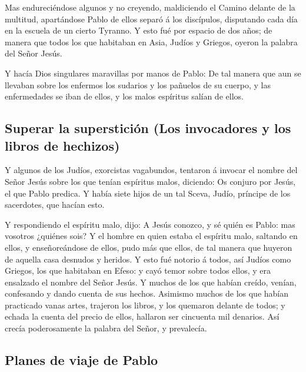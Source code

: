  Mas endureciéndose algunos y no creyendo, maldiciendo el
Camino delante de la multitud, apartándose Pablo de ellos separó á los
discípulos, disputando cada día en la escuela de un cierto Tyranno.
 Y esto fué por espacio de dos años; de manera que todos
los que habitaban en Asia, Judíos y Griegos, oyeron la palabra del Señor
Jesús.

 Y hacía Dios singulares maravillas por manos de Pablo:
 De tal manera que aun se llevaban sobre los enfermos los
sudarios y los pañuelos de su cuerpo, y las enfermedades se iban de
ellos, y los malos espíritus salían de ellos.

\hypertarget{superar-la-supersticiuxf3n-los-invocadores-y-los-libros-de-hechizos}{%
\subsection{Superar la superstición (Los invocadores y los libros de
hechizos)}\label{superar-la-supersticiuxf3n-los-invocadores-y-los-libros-de-hechizos}}

 Y algunos de los Judíos, exorcistas vagabundos, tentaron á
invocar el nombre del Señor Jesús sobre los que tenían espíritus malos,
diciendo: Os conjuro por Jesús, el que Pablo predica.  Y
había siete hijos de un tal Sceva, Judío, príncipe de los sacerdotes,
que hacían esto.

 Y respondiendo el espíritu malo, dijo: A Jesús conozco, y
sé quién es Pablo: mas vosotros ¿quiénes sois?  Y el hombre
en quien estaba el espíritu malo, saltando en ellos, y enseñoreándose de
ellos, pudo más que ellos, de tal manera que huyeron de aquella casa
desnudos y heridos.  Y esto fué notorio á todos, así Judíos
como Griegos, los que habitaban en Efeso: y cayó temor sobre todos
ellos, y era ensalzado el nombre del Señor Jesús.  Y muchos
de los que habían creído, venían, confesando y dando cuenta de sus
hechos.  Asimismo muchos de los que habían practicado vanas
artes, trajeron los libros, y los quemaron delante de todos; y echada la
cuenta del precio de ellos, hallaron ser cincuenta mil denarios.
 Así crecía poderosamente la palabra del Señor, y
prevalecía.

\hypertarget{planes-de-viaje-de-pablo}{%
\subsection{Planes de viaje de Pablo}\label{planes-de-viaje-de-pablo}}

